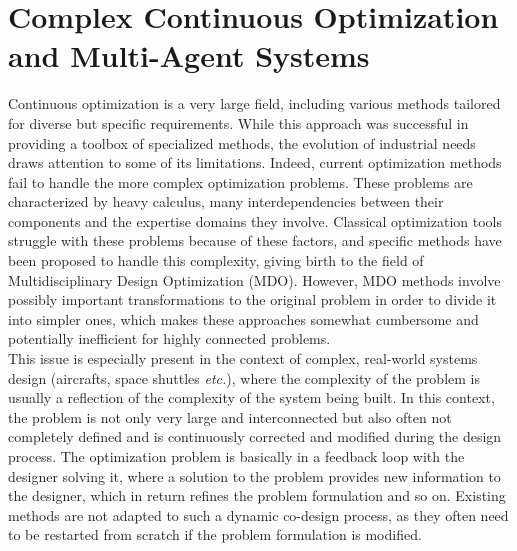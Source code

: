  \label{introduction}

\section*{Complex Continuous Optimization and Multi-Agent Systems}

Continuous optimization is a very large field, including various methods tailored for diverse but specific requirements. While this approach was successful in providing a toolbox of specialized methods, the evolution of industrial needs draws attention to some of its limitations. Indeed, current optimization methods fail to handle the more complex optimization problems. These problems are characterized by heavy calculus, many interdependencies between their components and the expertise domains they involve. Classical optimization tools struggle with these problems because of these factors, and specific methods have been proposed to handle this complexity, giving birth to the field of Multidisciplinary Design Optimization (MDO). However, MDO methods involve possibly important transformations to the original problem in order to divide it into simpler ones, which makes these approaches somewhat cumbersome and potentially inefficient for highly connected problems.\\
This issue is especially present in the context of complex, real-world systems design (aircrafts, space shuttles \emph{etc.}), where the complexity of the problem is usually a reflection of the complexity of the system being built. In this context, the problem is not only very large and interconnected but also often not completely defined and is continuously corrected and modified during the design process. The optimization problem is basically in a feedback loop with the designer solving it, where a solution to the problem provides new information to the designer, which in return refines the problem formulation and so on. Existing methods are not adapted to such a dynamic co-design process, as they often need to be restarted from scratch if the problem formulation is modified.

